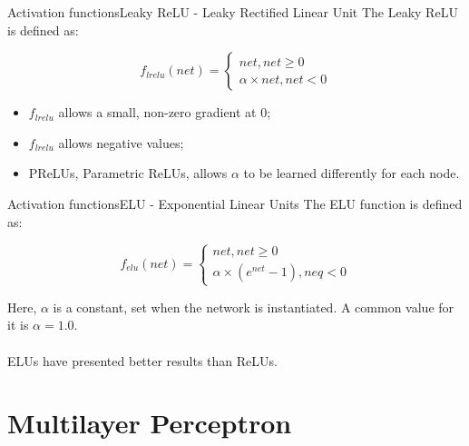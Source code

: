 \documentclass{beamer}
\begin{document}
        \begin{frame}{Activation functions}{Leaky ReLU - Leaky Rectified Linear Unit}
            The Leaky ReLU is defined as:

            \begin{displaymath}
                f_{lrelu}(net)=
                \begin{cases}
                    net, net \geq 0\\
                    \alpha \times net, net < 0
                \end{cases}
            \end{displaymath}

            \begin{itemize}
                \item $f_{lrelu}$ allows a small, non-zero gradient at $0$;
                \item $f_{lrelu}$ allows negative values;
                \item PReLUs, Parametric ReLUs, allows $\alpha$ to be learned differently for each node.
            \end{itemize}
        \end{frame}

        \begin{frame}{Activation functions}{ELU - Exponential Linear Units}
            The ELU function is defined as:

            \begin{displaymath}
                f_{elu}(net) = 
                \begin{cases}
                    net, net \geq 0\\
                    \alpha \times (e^{net} - 1), neq < 0
                \end{cases}
            \end{displaymath}

            Here, $\alpha$ is a constant, set when the network is instantiated. A common
            value for it is $\alpha = 1.0$.\\~\\

            ELUs have presented better results than ReLUs.

        \end{frame}



\section{Multilayer Perceptron}
\end{document}
